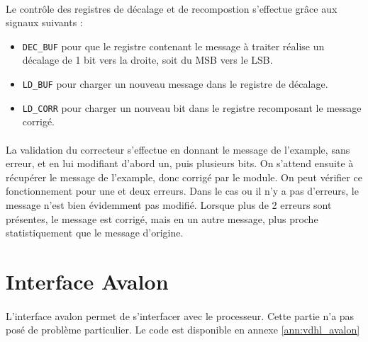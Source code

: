 \documentclass[a4paper, 11pt, svgnames]{report}
\begin{document}
            \paragraph{}
                Le contrôle des registres de décalage et de recompostion 
                s'effectue grâce aux signaux suivants :
                 \begin{itemize}
                    \item \verb|DEC_BUF| pour que le registre contenant le
                        message à traiter réalise un décalage de 1 bit vers la
                         droite, soit du MSB vers le LSB. 
                    \item \verb|LD_BUF| pour charger un nouveau message dans le
                        registre de décalage.
                    \item \verb|LD_CORR| pour charger un nouveau bit dans le
                        registre recomposant le message corrigé.
                \end{itemize}
            
            \paragraph{}
                La validation du correcteur s'effectue en donnant le message de
                l'example, sans erreur, et en lui modifiant d'abord un, puis
                plusieurs bits. On s'attend ensuite à récupérer le message de
                l'example, donc corrigé par le module. On peut vérifier ce
                fonctionnement pour une et deux erreurs. Dans le cas ou il n'y
                a pas d'erreurs, le message n'est bien évidemment pas modifié.
                Lorsque plus de 2 erreurs sont présentes, le message est
                corrigé, mais en un autre message, plus proche statistiquement
                que le message d'origine.


        \section{Interface Avalon}
            \paragraph{}
                L'interface avalon permet de s'interfacer avec le processeur. Cette
                partie n'a pas posé de problème particulier. Le code est disponible en annexe
                \ref{ann:vdhl_avalon}
\end{document}
